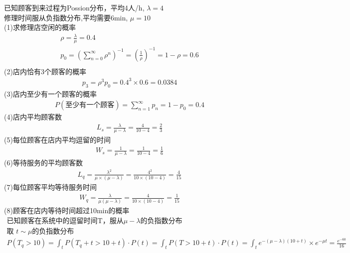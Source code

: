 \documentclass{article}
\begin{document}
    已知顾客到来过程为Possion分布，平均4人/h, $\lambda = 4$\\
    修理时间服从负指数分布,平均需要6min, $\mu = 10$\\
    (1)求修理店空闲的概率\\
    \begin{gather*}
        \rho = \frac{\lambda}{\mu} = 0.4\\
        p_0 = \left(\sum_{n=0}^\infty \rho^n\right)^{-1} 
    = \left(\frac{1}{\rho}\right)^{-1}
    = 1-\rho = 0.6\\
    \end{gather*}
    (2)店内恰有3个顾客的概率\\
    \begin{gather*}
        p_3 = \rho^3 p_0 = 0.4^3 \times 0.6 = 0.0384
    \end{gather*}
    (3)店内至少有一个顾客的概率\\
    \begin{gather*}
        P(\text{至少有一个顾客})= \sum_{n=1}^{\infty} p_n = 1- p_0 = 0.4
    \end{gather*}
    (4)店内平均顾客数\\
    \begin{gather*}
        L_s = \frac{\lambda}{\mu - \lambda}
    = \frac{4}{10 - 4} = \frac{2}{3} 
    \end{gather*}
    (5)每位顾客在店内平均逗留的时间\\
    \begin{gather*}
        W_s = \frac{1}{\mu - \lambda}
    = \frac{1}{10 - 4} = \frac{1}{6}
    \end{gather*}
    (6)等待服务的平均顾客数\\
    \begin{gather*}
        L_q = \frac{\lambda ^2}{\mu \times (\mu - \lambda)}
    = \frac{4^2}{10 \times (10 - 4)}
    = \frac{4}{15}
    \end{gather*}
    (7)每位顾客平均等待服务时间\\
    \begin{gather*}
        W_q = \frac{\lambda}{\mu(\mu - \lambda)}
    = \frac{4}{10 \times (10 - 4)} = \frac{1}{15}
    \end{gather*}
    (8)顾客在店内等待时间超过10min的概率\\
    \begin{gather*}
        \text{已知顾客在系统中的逗留时间T，服从$\mu-\lambda$的负指数分布}\\
        \text{取 $t \sim \mu $的负指数分布}\\
        P(T_q > 10) = \int_t P(T_q + t > 10 + t) \cdot P(t) 
    = \int_t P(T > 10 + t) \cdot P(t)
    = \int_t e^{-(\mu-\lambda)(10+t)} \times e^{-\mu t}
    = \frac{e^{-60}}{16}                            
    \end{gather*}
\end{document}
